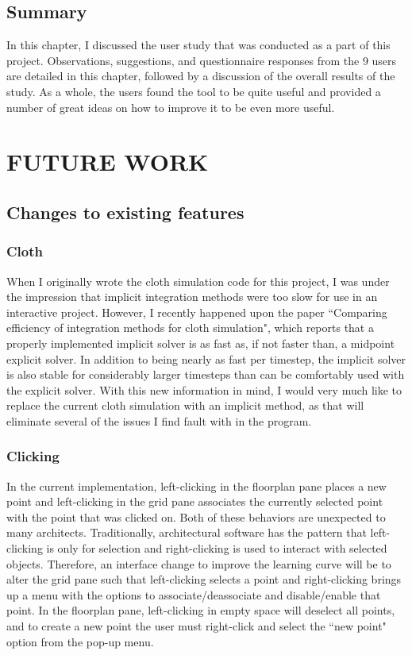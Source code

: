 \documentclass{thesis}
\begin{document}
\section{Summary}
In this chapter, I discussed the user study that was conducted as a part of this project.  Observations, suggestions, and
questionnaire responses from the 9 users are detailed in this chapter, followed by a discussion of the overall results of the study.
As a whole, the users found the tool to be quite useful and provided a number of great ideas on how to improve it to be even more
useful.


\chapter{FUTURE WORK}

\section{Changes to existing features}

\subsection{Cloth}
When I originally wrote the cloth simulation code for this project, I was under the impression that implicit integration methods were
too slow for use in an interactive project.  However, I recently happened upon the paper ``Comparing efficiency of integration methods
for cloth simulation"\cite{volino01comparingefficiency}\nocite{volino00fastcloth}, which reports that a properly implemented implicit
solver is as fast as, if not faster than, a midpoint explicit solver.  In addition to being nearly as fast per timestep, the implicit
solver is also stable for considerably larger timesteps than can be comfortably used with the explicit solver.  With this new
information in mind, I would very much like to replace the current cloth simulation with an implicit method, as that will eliminate
several of the issues I find fault with in the program.

\subsection{Clicking}
In the current implementation, left-clicking in the floorplan pane places a new point and left-clicking in the grid pane associates
the currently selected point with the point that was clicked on.  Both of these behaviors are unexpected to many architects.
Traditionally, architectural software has the pattern that left-clicking is only for selection and right-clicking is used to interact
with selected objects.  Therefore, an interface change to improve the learning curve will be to alter the grid pane such that
left-clicking selects a point and right-clicking brings up a menu with the options to associate/deassociate and disable/enable that
point.  In the floorplan pane, left-clicking in empty space will deselect all points, and to create a new point the user must
right-click and select the ``new point" option from the pop-up menu.
\end{document}
